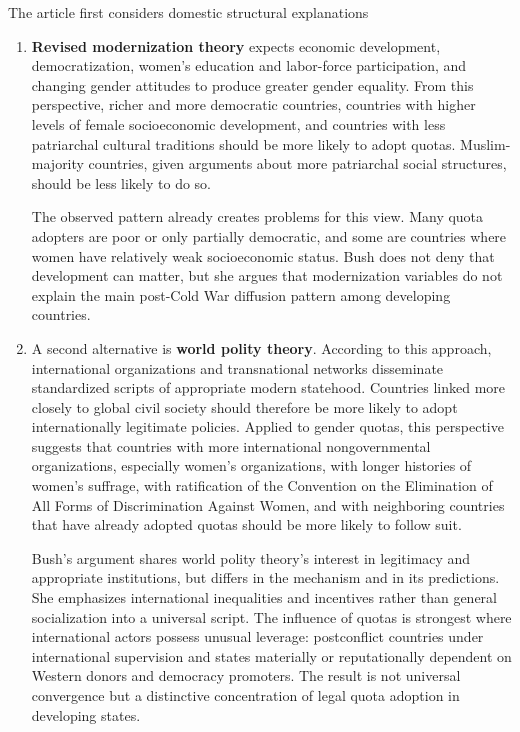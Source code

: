 The article first considers domestic structural explanations

\begin{enumerate}
    \item \textbf{Revised modernization theory} expects economic development, democratization, women's education and labor-force participation, and changing gender attitudes to produce greater gender equality. From this perspective, richer and more democratic countries, countries with higher levels of female socioeconomic development, and countries with less patriarchal cultural traditions should be more likely to adopt quotas. Muslim-majority countries, given arguments about more patriarchal social structures, should be less likely to do so.

    The observed pattern already creates problems for this view. Many quota adopters are poor or only partially democratic, and some are countries where women have relatively weak socioeconomic status. Bush does not deny that development can matter, but she argues that modernization variables do not explain the main post-Cold War diffusion pattern among developing countries.

    \item A second alternative is \textbf{world polity theory}. According to this approach, international organizations and transnational networks disseminate standardized scripts of appropriate modern statehood. Countries linked more closely to global civil society should therefore be more likely to adopt internationally legitimate policies. Applied to gender quotas, this perspective suggests that countries with more international nongovernmental organizations, especially women's organizations, with longer histories of women's suffrage, with ratification of the Convention on the Elimination of All Forms of Discrimination Against Women, and with neighboring countries that have already adopted quotas should be more likely to follow suit.

    Bush's argument shares world polity theory's interest in legitimacy and appropriate institutions, but differs in the mechanism and in its predictions. She emphasizes international inequalities and incentives rather than general socialization into a universal script. The influence of quotas is strongest where international actors possess unusual leverage: postconflict countries under international supervision and states materially or reputationally dependent on Western donors and democracy promoters. The result is not universal convergence but a distinctive concentration of legal quota adoption in developing states.
\end{enumerate}

